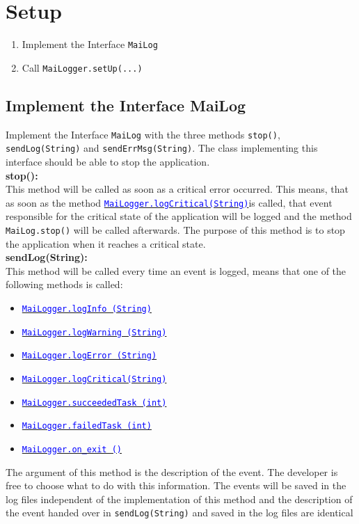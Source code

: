 \documentclass{article}
\newcommand{\refh}[2]{\hyperref[#1] {\textcolor{blue}{#2}}}
\newcommand{\logInfo}{\refh{logging_info}{\lstinline|MaiLogger.logInfo (String)|}}
\newcommand{\logWarning}{\refh{logging_warning}{\lstinline|MaiLogger.logWarning (String)|}}
\newcommand{\logError}{\refh{logging_error}{\lstinline|MaiLogger.logError (String)|}}
\newcommand{\logCritical}{\refh{logging_critical}{\lstinline|MaiLogger.logCritical(String)|}}
\newcommand{\succeededTask}{\refh{tasks_succeededTask}{\lstinline|MaiLogger.succeededTask (int)|}}
\newcommand{\failedTask}{\refh{tasks_failedTask}{\lstinline|MaiLogger.failedTask (int)|}}
\newcommand{\onExit}{\refh{on_exit}{\lstinline|MaiLogger.on_exit ()|}}
\begin{document}
\pagebreak
\section{Setup}
\label{setup}
    \begin{enumerate}
        \item Implement the Interface \lstinline|MaiLog|
        \item Call \lstinline|MaiLogger.setUp(...)|
    \end{enumerate}

    \subsection{Implement the Interface MaiLog}
    \label{setup_interface}
    Implement the Interface \lstinline|MaiLog| with the three methods \lstinline|stop()|, \lstinline|sendLog(String)| and \lstinline|sendErrMsg(String)|.
    The class implementing this interface should be able to stop the application. \\

    \textbf{stop():} \\
    This method will be called as soon as a critical error occurred.
    This means, that as soon as the method \logCritical is called, that event responsible for the critical state of the application will be logged and the method \lstinline|MaiLog.stop()| will be called afterwards.
    The purpose of this method is to stop the application when it reaches a critical state. \\

    \textbf{sendLog(String):} \\
    This method will be called every time an event is logged, means that one of the following methods is called:
    \begin{itemize}
        \item \logInfo
        \item \logWarning
        \item \logError
        \item \logCritical
        \item \succeededTask
        \item \failedTask
        \item \onExit
    \end{itemize}
    The argument of this method is the description of the event.
    The developer is free to choose what to do with this information.
    The events will be saved in the log files independent of the implementation of this method and the description of the event handed over in \lstinline|sendLog(String)| and saved in the log files are identical \\
\end{document}
